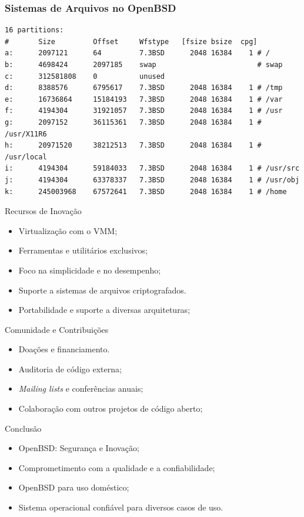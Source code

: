 \documentclass[9pt,xcolor=table]{beamer}
\begin{document}
\begin{frame}[fragile]
\frametitle{Sistemas de Arquivos no OpenBSD}
\begin{lstlisting}[caption=Partições padrão do OpenBSD]
16 partitions:
#       Size         Offset     Wfstype   [fsize bsize  cpg]
a:      2097121      64         7.3BSD      2048 16384    1 # /
b:      4698424      2097185    swap                        # swap
c:      312581808    0          unused
d:      8388576      6795617    7.3BSD      2048 16384    1 # /tmp
e:      16736864     15184193   7.3BSD      2048 16384    1 # /var
f:      4194304      31921057   7.3BSD      2048 16384    1 # /usr
g:      2097152      36115361   7.3BSD      2048 16384    1 # /usr/X11R6
h:      20971520     38212513   7.3BSD      2048 16384    1 # /usr/local
i:      4194304      59184033   7.3BSD      2048 16384    1 # /usr/src
j:      4194304      63378337   7.3BSD      2048 16384    1 # /usr/obj
k:      245003968    67572641   7.3BSD      2048 16384    1 # /home
\end{lstlisting}
\end{frame}
\begin{frame}{Recursos de Inovação}
  \begin{itemize}
    \item Virtualização com o VMM;
    \item Ferramentas e utilitários exclusivos;
    \item Foco na simplicidade e no desempenho;
    \item Suporte a sistemas de arquivos criptografados.
    \item Portabilidade e suporte a diversas arquiteturas;
  \end{itemize}
\end{frame}
\begin{frame}{Comunidade e Contribuições}
  \begin{itemize}
    \item Doações e financiamento.
    \item Auditoria de código externa;
    \item \textit{Mailing lists} e conferências anuais;
    \item Colaboração com outros projetos de código aberto;
  \end{itemize}
\end{frame}
\begin{frame}{Conclusão}
  \begin{itemize}
    \item OpenBSD: Segurança e Inovação;
    \item Comprometimento com a qualidade e a confiabilidade;
    \item OpenBSD para uso doméstico;
    \item Sistema operacional confiável para diversos casos de uso.
  \end{itemize}
\end{frame}
\end{document}
